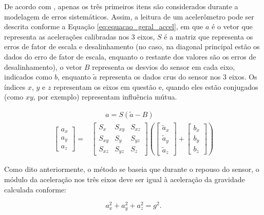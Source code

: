 \documentclass[acronym, symbols, table, deposito]{fei}
\begin{document}
			De acordo com \textcite{hassan2020field}, apenas os três primeiros itens são considerados durante a modelagem de erros sistemáticos. Assim, a leitura de um acelerômetro pode ser descrita conforme a Equação \eqref{eq:equacao_geral_accel}, em que $a$ é o vetor que representa as acelerações calibradas nos 3 eixos, $S$ é a matriz que representa os erros de fator de escala e desalinhamento (no caso, na diagonal principal estão os dados do erro de fator de escala, enquanto o restante dos valores são os erros de desalinhamento), o vetor $B$ representa os desvios do sensor em cada eixo, indicados como $b$, enquanto $\tilde{a}$ representa os dados crus do sensor nos 3 eixos. Os índices $x$, $y$ e $z$ representam os eixos em questão e, quando eles estão conjugados (como $xy$, por exemplo) representam influência mútua.
			
			\begin{equation}\label{eq:equacao_geral_accel}
				\begin{split}
					&\quad \quad a = S(\tilde{a} - B) \\
					\begin{bmatrix}
						a_x \\ a_y \\ a_z
					\end{bmatrix} = 
					&\begin{bmatrix}
						S_x & S_{xy} & S_{xz} \\ S_{xy} & S_y & S_{yz} \\ S_{xz} & S_{yz} & S_z
					\end{bmatrix} \left(
					\begin{bmatrix}
						\tilde{a}_x \\ \tilde{a}_y \\ \tilde{a}_z
					\end{bmatrix} + 
					\begin{bmatrix}
						b_x \\ b_y \\ b_z
					\end{bmatrix}\right)
				\end{split}
			\end{equation}
			
			Como dito anteriormente, o método se baseia que durante o repouso do sensor, o módulo da aceleração nos três eixos deve ser igual à aceleração da gravidade calculada conforme:
			
			\begin{equation} \label{eq:calibracao_gravidade}
				a_{x}^{2} + a_{y}^{2} + a_{z}^{2} = g^{2}.
			\end{equation}
			
\end{document}
